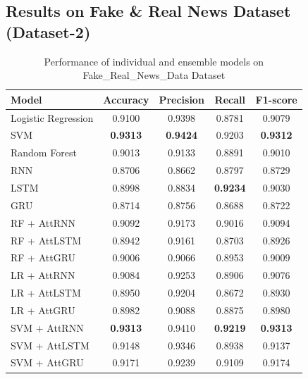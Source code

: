 \documentclass[conference]{IEEEtran}
\begin{document}
\subsection{Results on Fake \& Real News Dataset (Dataset-2)}
\begin{table}[H]
\centering
\caption{Performance of individual and ensemble models on Fake\_Real\_News\_Data Dataset}
\label{tab:dataset2_main}
\footnotesize
{}
\begin{tabular}{l S[table-format=1.4] S[table-format=1.4] S[table-format=1.4] S[table-format=1.4]}
\toprule
{Model} & {Accuracy} & {Precision} & {Recall} & {F1-score} \\
\midrule
Logistic Regression     & 0.9100 & 0.9398 & 0.8781 & 0.9079 \\
SVM                     & \textbf{0.9313} & \textbf{0.9424} & 0.9203 & \textbf{0.9312} \\
Random Forest           & 0.9013 & 0.9133 & 0.8891 & 0.9010 \\
RNN                     & 0.8706 & 0.8662 & 0.8797 & 0.8729 \\
LSTM                    & 0.8998 & 0.8834 & \textbf{0.9234} & 0.9030 \\
GRU                     & 0.8714 & 0.8756 & 0.8688 & 0.8722 \\
\midrule
RF + AttRNN             & 0.9092 & 0.9173 & 0.9016 & 0.9094 \\
RF + AttLSTM            & 0.8942 & 0.9161 & 0.8703 & 0.8926 \\
RF + AttGRU             & 0.9006 & 0.9066 & 0.8953 & 0.9009 \\
LR + AttRNN             & 0.9084 & 0.9253 & 0.8906 & 0.9076 \\
LR + AttLSTM            & 0.8950 & 0.9204 & 0.8672 & 0.8930 \\
LR + AttGRU             & 0.8982 & 0.9088 & 0.8875 & 0.8980 \\
SVM + AttRNN            & \textbf{0.9313} & 0.9410 & \textbf{0.9219} & \textbf{0.9313} \\
SVM + AttLSTM           & 0.9148 & 0.9346 & 0.8938 & 0.9137 \\
SVM + AttGRU            & 0.9171 & 0.9239 & 0.9109 & 0.9174 \\
\bottomrule
\end{tabular}
\end{table}
\end{document}
